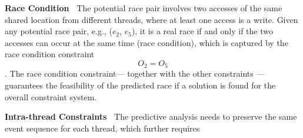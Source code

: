 

{\bf Race Condition\ } The potential race pair involves two accesses of the same shared location from different threads, where at least one access is a write. Given any potential race pair, e.g., ($e_2$, $e_5$), it is a real race if and only if the two accesses can occur at the same time (race condition), which is captured by the race condition constraint
$$
	O_2 = O_5
$$.
The race condition constraint--- together with the other constraints --- guarantees the feasibility of the predicted race if a solution is found for the overall constraint system.

{\bf Intra-thread Constraints\ } The predictive analysis needs to preserve the same event sequence for each thread, which further requires 

